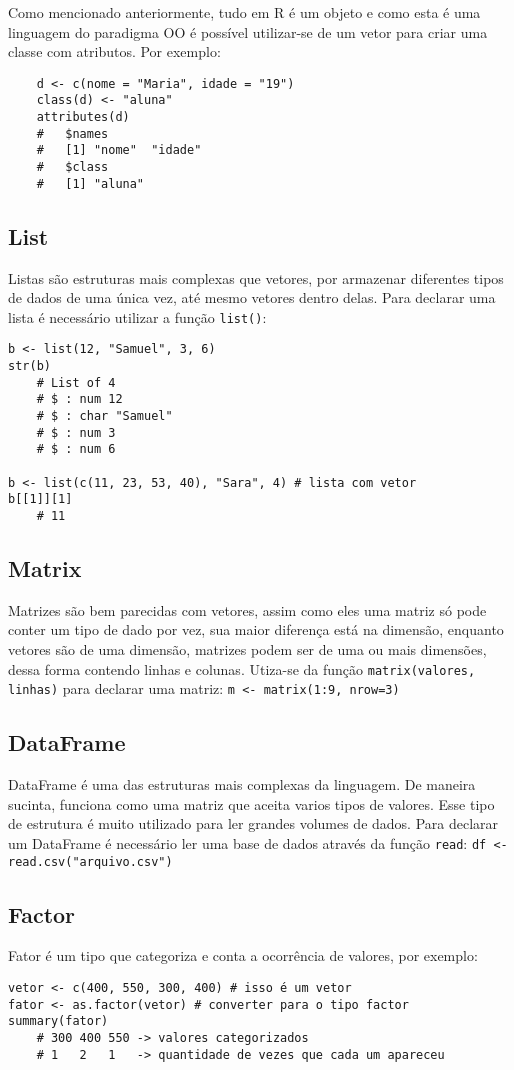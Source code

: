 \documentclass[12pt]{article}
\begin{document}
Como mencionado anteriormente, tudo em R é um objeto e como esta é uma linguagem do paradigma OO é possível utilizar-se de um vetor para criar uma classe com atributos. Por exemplo:

    \begin{verbatim}
    d <- c(nome = "Maria", idade = "19") 
    class(d) <- "aluna"
    attributes(d)
    #   $names
    #   [1] "nome"  "idade"
    #   $class
    #   [1] "aluna"
    \end{verbatim}

\subsection{List}
Listas são estruturas mais complexas que vetores, por armazenar diferentes tipos de dados de uma única vez, até mesmo vetores dentro delas.
    Para declarar uma lista é necessário utilizar a função \texttt{list()}:
\begin{verbatim}
b <- list(12, "Samuel", 3, 6)
str(b)
    # List of 4
    # $ : num 12
    # $ : char "Samuel"
    # $ : num 3
    # $ : num 6
    
b <- list(c(11, 23, 53, 40), "Sara", 4) # lista com vetor
b[[1]][1]
    # 11
\end{verbatim}

\subsection{Matrix}
    Matrizes são bem parecidas com vetores, assim como eles uma matriz só pode conter um tipo de dado por vez, sua maior diferença está na dimensão, enquanto vetores são de uma dimensão, matrizes podem ser de uma ou mais dimensões, dessa forma contendo linhas e colunas.
    Utiza-se da função \texttt{matrix(valores, linhas)} para declarar uma matriz: \texttt{m <- matrix(1:9, nrow=3)}
    
\subsection{DataFrame}
    DataFrame é uma das estruturas mais complexas da linguagem. De maneira sucinta, funciona como uma matriz que aceita varios tipos de valores. Esse tipo de estrutura é muito utilizado para ler grandes volumes de dados. Para declarar um DataFrame é necessário ler uma base de dados através da função \texttt{read}: \texttt{df <- read.csv("arquivo.csv")}

\subsection{Factor}
 Fator é um tipo que categoriza e conta a ocorrência de valores, por exemplo:
 \begin{verbatim}
vetor <- c(400, 550, 300, 400) # isso é um vetor
fator <- as.factor(vetor) # converter para o tipo factor
summary(fator)
    # 300 400 550 -> valores categorizados
    # 1   2   1   -> quantidade de vezes que cada um apareceu
 \end{verbatim}
\end{document}
